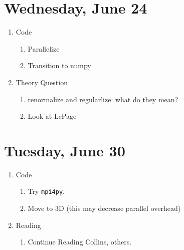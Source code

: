 \documentclass[english]{article}
\begin{document}
 \section{Wednesday, June 24}
    \begin{enumerate}

        \item Code
        \begin{enumerate}
            \item Parallelize
            \item Transition to numpy
        \end{enumerate}
        \item Theory Question
        \begin{enumerate}
            \item renormalize and regularlize: what do they mean?
            \item Look at LePage
        \end{enumerate}

    \end{enumerate}

 \section{Tuesday, June 30}
    \begin{enumerate}
        \item Code
        \begin{enumerate}
            \item Try \texttt{mpi4py}.
            \item Move to 3D (this may decrease parallel overhead)
        \end{enumerate}

        \item Reading
        \begin{enumerate}
            \item Continue Reading Collins, others. 
        \end{enumerate}
    \end{enumerate}
\end{document}
